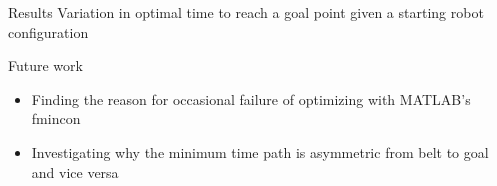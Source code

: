 \documentclass[final]{beamer}
\begin{document}
\begin{frame}{}
{\begin{columns}[t]
\begin{column}{.30\linewidth}
\begin{block}{\centering Results}
Variation in optimal time to reach a goal point given a starting robot configuration

\end{block}



                
                
\begin{block}{\centering Future work}
\begin{itemize}
	\item Finding the reason for occasional failure of optimizing with MATLAB's fmincon
	\item Investigating why the minimum time path is asymmetric from belt to goal and vice versa
\end{itemize}
\end{block}
                
                

%                       
                

                    
                       
                    
                

\end{column}
\end{columns}}
\end{frame}
\end{document}
